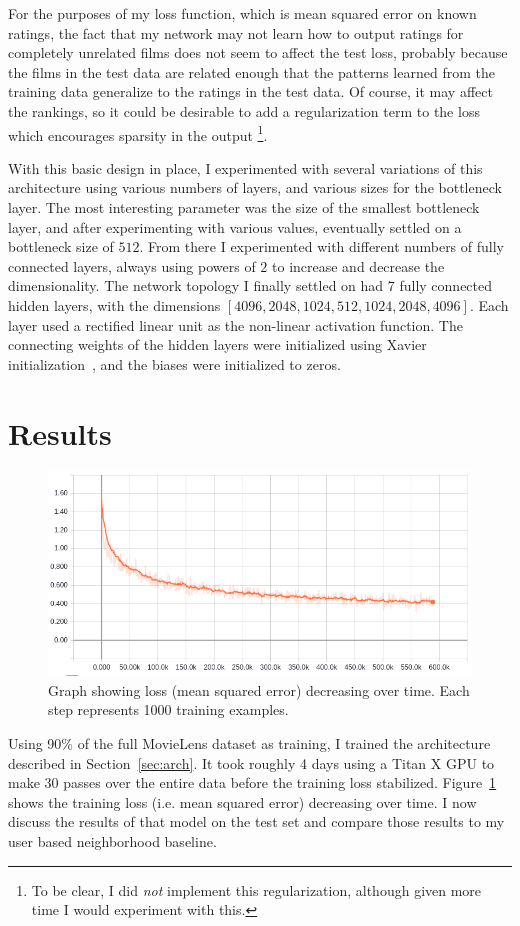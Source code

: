 \documentclass[12pt]{article}
\begin{document}
For the purposes of my loss function, which is mean squared error on known
ratings, the fact that my network may not learn how to output ratings for
completely unrelated films does not seem to affect the test loss, probably
because the films in the test data are related enough that the patterns
learned from the training data generalize to the ratings in the test data.
Of course, it may affect the rankings, so it could be desirable to add a
regularization term to the loss which encourages sparsity in the output%
\footnote{To be clear, I did \textit{not} implement this regularization,
although given more time I would experiment with this.}.

With this basic design in place, I experimented with several variations of
this architecture using various numbers of layers, and various sizes for the
bottleneck layer.
The most interesting parameter was the size of the smallest bottleneck layer,
and after experimenting with various values,  eventually settled on a
bottleneck size of $512$.
From there I experimented with different numbers of fully connected layers,
always using powers of $2$ to increase and decrease the dimensionality.
The network topology I finally settled on had 7 fully connected hidden layers,
with the dimensions
$[4096, 2048, 1024, 512, 1024, 2048, 4096]$.
Each layer used a rectified linear unit
as the non-linear activation function.
The connecting weights of the hidden layers were initialized using Xavier
initialization~\cite{xavier}, and the biases were initialized to zeros.

\section{Results}
\label{sec:results}

\begin{figure}
\centering
\includegraphics[width=.5\textwidth]{train}
\caption{Graph showing loss (mean squared error) decreasing over time. Each
step represents 1000 training examples.}
\label{fig:train}
\end{figure}

Using 90\% of the full MovieLens dataset as training, I trained the
architecture described in Section~\ref{sec:arch}.
It took roughly 4 days using a Titan X GPU to make 30 passes over the entire
data before the training loss stabilized.
Figure~\ref{fig:train} shows the training loss (i.e. mean squared error)
decreasing over time.
I now discuss the results of that model on the test set and compare those
results to my user based neighborhood baseline.
\end{document}
